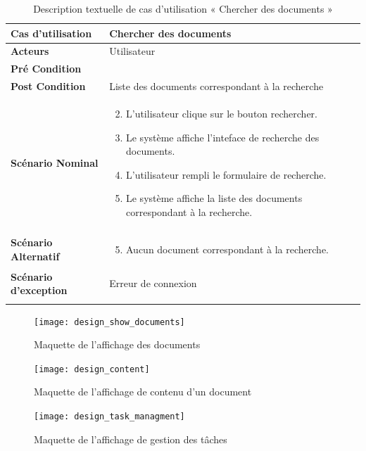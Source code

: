 \begin{longtable}{|p{5cm}|p{10cm}|}
\hline
\textbf{Cas d'utilisation}&Chercher des documents\\
\hline
\textbf{Acteurs}&Utilisateur\\
\hline
\textbf{Pré Condition}&\\
\hline
\textbf{Post Condition}&Liste des documents correspondant à la recherche\\
\hline
\textbf{Scénario Nominal}&
\vspace{-\baselineskip}
\begin{enumerate}
    \setcounter{enumi}{1}
    \item L'utilisateur clique sur le bouton rechercher.
    \item Le système affiche l'inteface de recherche des documents.
    \item L'utilisateur rempli le formulaire de recherche.
    \item Le système affiche la liste des documents correspondant à la recherche.
\end{enumerate}\\
\hline
\textbf{Scénario Alternatif}&
\vspace{-\baselineskip}
\begin{enumerate}
    \setcounter{enumi}{4}
    \item Aucun document correspondant à la recherche.
\end{enumerate}\\
\hline
\textbf{Scénario d'exception}&Erreur de connexion\\
\hline
\caption{Description textuelle de cas d'utilisation « Chercher des documents »}
\label{tab:DescriptionTextuelleDeCasDUtilisationChercherDesDocuments}
\end{longtable}

\begin{figure}[H]
  \centering
  \texttt{[image: design\_show\_documents]}
  \caption{Maquette de l'affichage des documents}
  \label{fig:design_show_documents}
\end{figure}

\begin{figure}[H]
  \centering
  \texttt{[image: design\_content]}
  \caption{Maquette de l'affichage de contenu d'un document}
  \label{fig:design_show_document}
\end{figure}

\begin{figure}[H]
  \centering
  \texttt{[image: design\_task\_managment]}
  \caption{Maquette de l'affichage de gestion des tâches}
  \label{fig:design_manage_tasks}
\end{figure}

